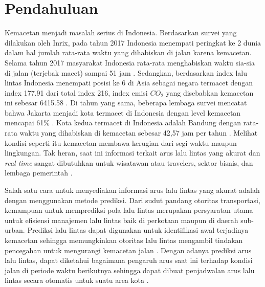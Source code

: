 \documentclass[conference]{IEEEtran}
\begin{document}
\section{Pendahuluan}
Kemacetan menjadi masalah serius di Indonesia. Berdasarkan survei yang dilakukan oleh Inrix, pada tahun 2017 Indonesia menempati peringkat ke 2 dunia dalam hal jumlah rata-rata waktu yang dihabiskan di jalan karena kemacetan. Selama tahun 2017 masyarakat Indonesia rata-rata menghabiskan waktu sia-sia di jalan (terjebak macet) sampai 51 jam \cite{Inrix2017Survei}. Sedangkan, berdasarkan index lalu lintas Indonesia menempati posisi ke 6 di Asia sebagai negara termacet dengan index 177.91 dari total index 216, index emisi $CO_2$ yang disebabkan kemacetan ini sebesar 6415.58 \cite{Numbeo2015Survei}. 
Di tahun yang sama, beberapa lembaga survei mencatat bahwa Jakarta menjadi kota termacet di Indonesia dengan level kemacetan mencapai 61\% \cite{TomTom2017Survei}. Kota kedua termacet di Indonesia adalah Bandung dengan rata-rata waktu yang dihabiskan di kemacetan sebesar 42,57 jam per tahun \cite{Inrix2017Survei}. Melihat kondisi seperti itu kemacetan membawa kerugian dari segi waktu maupun lingkungan.
Tak heran, saat ini informasi terkait arus lalu lintas yang akurat dan \textit{real time} sangat dibutuhkan untuk wisatawan atau travelers, sektor bisnis, dan lembaga pemerintah \cite{Zhang2008DynaCAS}.

Salah satu cara untuk menyediakan informasi arus lalu lintas yang akurat adalah dengan menggunakan metode prediksi. Dari sudut pandang otoritas transportasi, kemampuan untuk memprediksi pola lalu lintas merupakan persyaratan utama untuk efisiensi manajemen lalu lintas baik di perkotaan maupun di daerah sub-urban. Prediksi lalu lintas dapat digunakan untuk identifikasi awal terjadinya kemacetan sehingga memungkinkan otoritas lalu lintas mengambil tindakan pencegahan untuk mengurangi kemacetan
jalan \cite{Djahel2014SmartCity}. Dengan adanya prediksi arus lalu lintas, dapat diketahui bagaimana pengaruh arus saat ini terhadap kondisi jalan di periode waktu berikutnya sehingga dapat dibuat penjadwalan arus lalu lintas secara otomatis untuk suatu area kota \cite{Yuangfang2018TrafficPrediction}.
\end{document}
